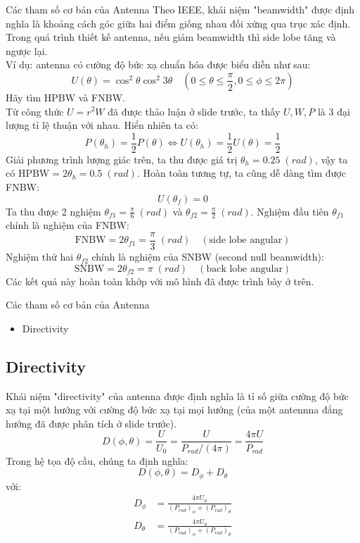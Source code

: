 \documentclass[8pt]{beamer}
\begin{document}
\begin{frame}{Các tham số cơ bản của Antenna}
 Theo IEEE, khái niệm "beamwidth" được định nghĩa là khoảng cách góc giữa hai điểm giống nhau đối xứng qua trục xác định.
\\ Trong quá trình thiết kế antenna, nếu giảm beamwidth thì side lobe tăng và ngược lại. 
\\ Ví dụ: antenna có cường độ bức xạ chuẩn hóa được biểu diễn như sau: 
$$U(\theta)=\cos^{2}{\theta}\cos^{2}{3\theta} \quad \left(0\leq\theta\leq\frac{\pi}{2},0\leq\phi\leq 2\pi\right)$$
Hãy tìm HPBW và FNBW.
\\ Từ công thức $U=r^2 W$ đã được thảo luận ở slide trước, ta thấy $U,W,P$ là 3 đại lượng tỉ lệ thuận với nhau. Hiển nhiên ta có:
$$P(\theta_{h})=\frac{1}{2}P(\theta)\Leftrightarrow U(\theta_{h})=\frac{1}{2}U(\theta)=\frac{1}{2}$$
Giải phương trình lượng giác trên, ta thu được giá trị $\theta_{h}=0.25\;(rad)$, vậy ta có $\text{HPBW}=2\theta_{h}=0.5\;(rad)$. Hoàn toàn tương tự, ta cũng dễ dàng tìm được FNBW:
$$U(\theta_{f})=0$$
Ta thu được 2 nghiệm $\theta_{f1}=\frac{\pi}{6}\;(rad)$ và $\theta_{f2}=\frac{\pi}{2}\;(rad)$. Nghiệm đầu tiên $\theta_{f1}$ chính là nghiệm của FNBW:
$$\text{FNBW}=2\theta_{f1}=\frac{\pi}{3}\;(rad)\quad (\text{side lobe angular})$$
Nghiệm thứ hai $\theta_{f2}$ chính là nghiệm của SNBW (second null beamwidth):
$$\text{SNBW}=2\theta_{f2}=\pi\;(rad)\quad (\text{back lobe angular})$$
Các kết quả này hoàn toàn khớp với mô hình đã được trình bày ở trên.
\end{frame}
\begin{frame}{Các tham số cơ bản của Antenna}
\begin{itemize}
	\item Directivity
\end{itemize}
\subsection{Directivity}
Khái niệm "directivity" của antenna được định nghĩa là tỉ số giữa cường độ bức xạ tại một hướng với cường độ bức xạ tại mọi hướng (của một antennna đẳng hướng đã được phân tích ở slide trước).
$$D(\phi,\theta)=\frac{U}{U_{0}}=\frac{U}{P_{rad}/(4\pi)}=\frac{4\pi U}{P_{rad}}$$
Trong hệ tọa độ cầu, chúng ta định nghĩa: $$D(\phi,\theta)=D_{\phi}+D_{\theta}$$
với: 
\begin{equation*}
\begin{split}
	D_{\phi}&=\frac{4\pi U_{\phi}}{(P_{rad})_{\phi}+(P_{rad})_{\theta}}\\
	D_{\theta}&=\frac{4\pi U_{\theta}}{(P_{rad})_{\phi}+(P_{rad})_{\theta}}
\end{split}
\end{equation*}
\end{frame}
\end{document}

